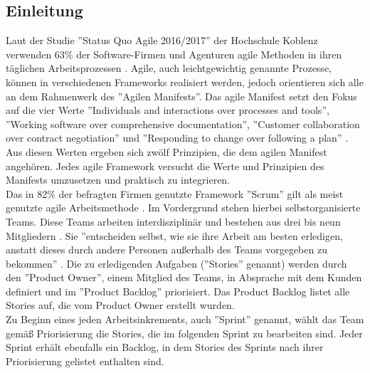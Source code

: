 \documentclass[12pt,titlepage]{scrartcl}
\begin{document}
		\subsection{Einleitung} \label{Einleitung}
		Laut der Studie ''Status Quo Agile 2016/2017'' der Hochschule Koblenz verwenden 63\% der Software-Firmen und Agenturen agile Methoden in ihren täglichen Arbeitsprozessen \cite{hskob}. Agile, auch leichtgewichtig genannte Prozesse, können in verschiedenen Frameworks realisiert werden, jedoch orientieren sich alle an dem Rahmenwerk des ''Agilen Manifests''. Das agile Manifest setzt den Fokus auf die vier Werte ''Individuals and interactions over processes and tools'', ''Working software over comprehensive documentation'', ''Customer collaboration over contract negotiation'' und ''Responding to change over following a plan'' \cite{manifest}. Aus diesen Werten ergeben sich zwölf Prinzipien, die dem agilen Manifest angehören. Jedes agile Framework versucht die Werte und Prinzipien des Manifests umzusetzen und praktisch zu integrieren. \\
		Das in 82\% der befragten Firmen genutzte Framework ''Scrum'' gilt als meist genutzte agile Arbeitsmethode \cite{hskob}. Im Vordergrund stehen hierbei selbstorganisierte Teams. Diese Teams arbeiten interdisziplinär und bestehen aus drei bis neun Mitgliedern \cite{guide}. Sie ''entscheiden selbst, wie sie ihre Arbeit am besten erledigen, anstatt dieses durch andere Personen außerhalb des Teams vorgegeben zu bekommen'' \cite{guide}. Die zu erledigenden Aufgaben (''Stories'' genannt) werden durch den ''Product Owner'', einem Mitglied des Teams, in Absprache mit dem Kunden definiert und im ''Product Backlog'' priorisiert. Das Product Backlog listet alle Stories auf, die vom Product Owner erstellt wurden.\\
		Zu Beginn eines jeden Arbeitsinkrements, auch ''Sprint'' genannt, wählt das Team gemäß Priorisierung die Stories, die im folgenden Sprint zu bearbeiten sind. Jeder Sprint erhält ebenfalls ein Backlog, in dem Stories des Sprints nach ihrer Priorisierung gelistet enthalten sind. \\ 
\end{document}
